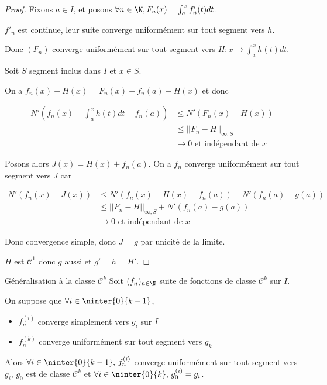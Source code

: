 
\begin{proof}
    Fixons $a \in I$, et posons $\forall n \in \N, F_n(x) = \int_{a}^{x } f_n'(t) dt$.

    $f'_n$ est continue, leur suite converge uniformément sur tout segment vers $h$. 

    Donc $(F_n)$ converge uniformément sur tout segment vers $H : x \mapsto \int_a^x h(t) dt$.

    \avspace Soit $S$ segment inclus dans $I$ et $x \in S$. 
    
    On a 
    $f_n(x) - H(x) = F_n(x) + f_n(a) - H(x)$ et donc 

    \begin{align}
        N'(f_n(x) - \int_{a }^{x } h(t) dt - f_n(a)) & \leqslant N'(F_n(x) - H(x)) \\
        & \leqslant ||F_n - H||_{\infty, S} \\
        & \to 0 \text{ et indépendant de } x
    \end{align}

    Posons alors $J(x) = H(x) + f_n(a)$. On a $f_n$ converge uniformément sur tout segment vers 
    $J$ car  
    
    \begin{align}
        N'(f_n(x) - J(x)) & \leqslant N'(f_n(x) - H(x) - f_n(a)) + N'(f_n(a) - g(a)) \\
        & \leqslant ||F_n - H||_{\infty, S} + N'(f_n(a) - g(a)) \\
        & \to 0 \text{ et indépendant de } x
    \end{align}

    Donc convergence simple, donc $J = g$ par unicité de la limite. 

    $H$ est $\mathscr {C}^1$ donc $g$ aussi et $g' = h = H'$.
\end{proof}

\begin{theoreme}{Généralisation à la classe $\mathscr{C}^k$}{}
    Soit $(f_n)_{n \in \N}$ suite de fonctions de classe $\mathscr{C}^k$ sur $I$. 

    On suppose que  $\forall i \in \ninter{0}{k - 1}$, 
    \begin{itemize}
        \item $f_n^{(i)}$ converge simplement vers $g_i$ sur $I$
        \item $f_n^{(k)}$ converge uniformément sur tout segment vers $g_k$
    \end{itemize}

    Alors $\forall i \in \ninter{0}{k - 1}, \, f_n^{(i)}$ converge uniformément sur tout segment vers $g_i$,
    $g_0$ est de classe $\mathscr{C}^k$ et $\forall i \in \ninter{0}{k}, \, g_0^{(i)} = g_i$.
\end{theoreme}

